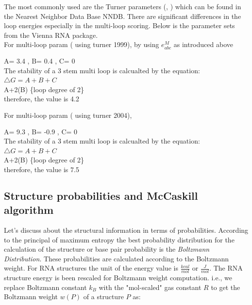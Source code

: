 \documentclass[twoside,a4paper]{report}
\numberwithin{equation}{section}
\begin{document}
 	 The most commonly used are the Turner parameters (\citep{mathews1999expanded}, \citep{mathews2004incorporating}) which can be found in the Nearest Neighbor Data Base NNDB. There are significant differences in the loop energies especially in the multi-loop scoring. Below is the parameter sets from the Vienna RNA package.  \\
 	 
 	 For multi-loop param ( using turner 1999), by using $e^M_{abc}$ as introduced above
 	 
 	 \begin{center}
 	 	A= 3.4 , B= 0.4 , C= 0\\
 	 	The stability of a 3 stem multi loop is calcualted by the equation:\\
 	 	$\triangle G = A+ B+ C $\\
 	 	A+2(B) \{loop degree of 2\}\\
 	 	therefore, the value is 4.2\\
 	 \end{center}
  
  For multi-loop param ( using turner 2004),
  
  \begin{center}
  	A= 9.3 , B= -0.9 , C= 0\\
  	The stability of a 3 stem multi loop is calcualted by the equation:\\
  	$\triangle G = A+ B+ C  $\\
  	A+2(B) \{loop degree of 2\}\\
  	therefore, the value is 7.5\\
  \end{center}
 	 
 	 \subsection{Structure probabilities and McCaskill algorithm}
 	 Let's discuss about the structural information in terms of probabilities. According to the principal of maximum entropy \citep{jaynes1957information} the best probability distribution for the calculation of the structure or base pair probability is the \textit{Boltzmann Distribution}. These probabilities are calculated according to the Boltzmann weight. For RNA structures the unit of the energy value is $\frac{kcal}{mol}$ or $\frac{J}{mol}$. The RNA structure energy is been rescaled for Boltzmann weight computation. i.e., we replace Boltzmann constant $k_B$ with the "mol-scaled" gas constant $R$ to get the Boltzmann weight $w(P)$ of a structure $P$ as:\\
 	 
\end{document}
